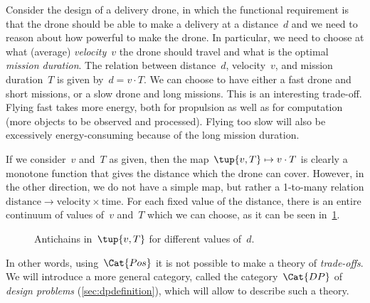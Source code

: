 \begin{example}
Consider the design of a delivery drone, in which the functional requirement is that the drone should be able to make a delivery at a distance~$d$ and we need to reason about how powerful to make the drone. In particular, we need to choose at what (average) \emph{velocity}~$v$ the drone  should travel and what is the optimal \emph{mission duration}. The relation between distance~$d$, velocity~$v$, and mission duration~$T$ is given by~$d=v\cdot T$. We can choose to have either a fast drone and short missions, or a slow drone and long missions. This is an interesting trade-off. Flying fast takes more energy, both for propulsion as well as for computation (more objects to be observed and processed). Flying too slow will also be excessively energy-consuming because of the long mission duration.

If we consider~$v$ and~$T$ as given, then the map~$\tup{v,T} \mapsto v\cdot T$ is clearly a monotone function that gives the distance which the drone can cover. However, in the other direction, we do not have a simple map, but rather a 1-to-many relation $\mathrm{distance}\to \mathrm{velocity}\times \mathrm{time}$. For each fixed value of the distance, there is an entire continuum of values of~$v$ and~$T$ which we can choose, as it can be seen in~\cref{fig:drone-example-antichain}.

\begin{figure}[h!]
    \centering
    \caption{Antichains in~$\tup{v,T}$ for different values of~$d$. \label{fig:drone-example}
    \label{fig:drone-example-antichain}}
\end{figure}

\end{example}

In other words, using~$\Cat{Pos}$ it is not possible to make a theory of \emph{trade-offs}. We will introduce a more general category, called  the category~$\Cat{DP}$ of \emph{design problems} (\cref{sec:dpdefinition}), which will allow to describe such a theory.



